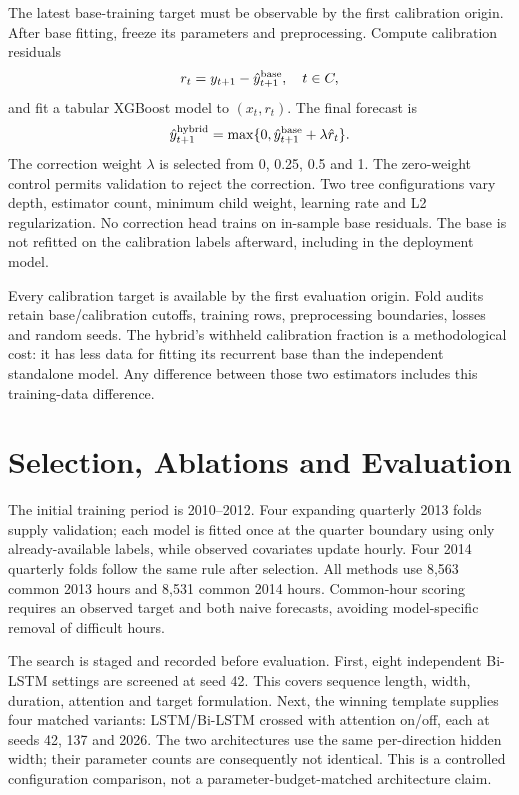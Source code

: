 \documentclass[conference]{IEEEtran}
\begin{document}
The latest base-training target must be observable by the first calibration origin. After base fitting, freeze its parameters and preprocessing. Compute calibration residuals
\begin{equation}
r_t=y_{t+1}-\hat y^{\rm base}_{t+1},\quad t\in C,
\end{equation}
and fit a tabular XGBoost model to $(x_t,r_t)$. The final forecast is
\begin{equation}
\hat y^{\rm hybrid}_{t+1}=\max\{0,\hat y^{\rm base}_{t+1}+\lambda\hat r_t\}.
\end{equation}
The correction weight $\lambda$ is selected from 0, 0.25, 0.5 and 1. The zero-weight control permits validation to reject the correction. Two tree configurations vary depth, estimator count, minimum child weight, learning rate and L2 regularization. No correction head trains on in-sample base residuals. The base is not refitted on the calibration labels afterward, including in the deployment model.

Every calibration target is available by the first evaluation origin. Fold audits retain base/calibration cutoffs, training rows, preprocessing boundaries, losses and random seeds. The hybrid's withheld calibration fraction is a methodological cost: it has less data for fitting its recurrent base than the independent standalone model. Any difference between those two estimators includes this training-data difference.

\section{Selection, Ablations and Evaluation}
The initial training period is 2010--2012. Four expanding quarterly 2013 folds supply validation; each model is fitted once at the quarter boundary using only already-available labels, while observed covariates update hourly. Four 2014 quarterly folds follow the same rule after selection. All methods use 8,563 common 2013 hours and 8,531 common 2014 hours. Common-hour scoring requires an observed target and both naive forecasts, avoiding model-specific removal of difficult hours.

The search is staged and recorded before evaluation. First, eight independent Bi-LSTM settings are screened at seed 42. This covers sequence length, width, duration, attention and target formulation. Next, the winning template supplies four matched variants: LSTM/Bi-LSTM crossed with attention on/off, each at seeds 42, 137 and 2026. The two architectures use the same per-direction hidden width; their parameter counts are consequently not identical. This is a controlled configuration comparison, not a parameter-budget-matched architecture claim.
\end{document}
